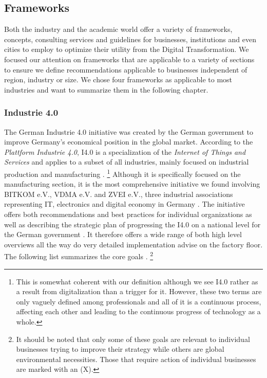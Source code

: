 \subsection{Frameworks}
\label{subsec:frameworks}



Both the industry and the academic world offer a variety of frameworks, concepts, consulting services and guidelines for businesses, institutions and even cities to employ to optimize their utility from the Digital Transformation.
We focused our attention on frameworks that are applicable to a variety of sections to ensure we define recommendations applicable to businesses independent of region, industry or size. 
We chose four frameworks as applicable to most industries and want to summarize them in the following chapter.

\subsubsection{Industrie 4.0}
The German Industrie 4.0 initiative was created by the German government to improve Germany's economical position in the global market. According to the \emph{Plattform Industrie 4.0}, I4.0 is a specialization of the \emph{Internet of Things and Services} and applies to a subset of all industries, mainly focused on industrial production and manufacturing \cite[p.41]{umsetzungsstrategie:2015}.
\footnote{This is somewhat coherent with our definition although we see \ac{I4.0} rather as a result from digitalization than a trigger for it. However, these two terms are only vaguely defined among professionals and all of it is a continuous process, affecting each other and leading to the continuous progress of technology as a whole.} 
Although it is specifically focused on the manufacturing section, it is the most comprehensive initiative we found involving BITKOM e.V., VDMA e.V. and ZVEI e.V., three industrial associations representing IT, electronics and digital economy in Germany \cite{zveimembers:2016, vdmamembers:2016, bitkommembers:2016}. The initiative offers both recommendations and best practices for individual organizations \cite[p.40ff.]{umsetzungsstrategie:2015} as well as describing the strategic plan of progressing the \ac{I4.0} on a national level for the German government \cite[p.15ff.]{umsetzungsstrategie:2015}. It therefore offers a wide range of both high level overviews all the way do very detailed implementation advise on the factory floor.
 The following list summarizes the core goals \cite[p.8]{umsetzungsstrategie:2015}. \footnote{It should be noted that only some of these goals are relevant to individual businesses trying to improve their strategy while others are global environmental necessities. Those that require action of individual businesses are marked with an (X).}

